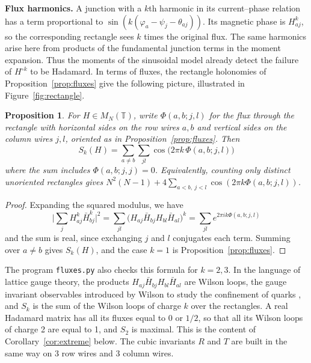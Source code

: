 \documentclass[11pt,a4paper]{article}
\newtheorem{prop}[thm]{Proposition}
\theoremstyle{remark}
\begin{document}
\medskip
\noindent\textbf{Flux harmonics.}
A junction with a $k$th harmonic in its current--phase relation has a term proportional to $\sin(k(\varphi_a-\psi_j-\theta_{aj}))$. Its magnetic phase is $H_{aj}^k$, so the corresponding rectangle sees $k$ times the original flux. The same harmonics arise here from products of the fundamental junction terms in the moment expansion. Thus the moments of the sinusoidal model already detect the failure of $H^{\circ k}$ to be Hadamard. In terms of fluxes, the rectangle holonomies of Proposition~\ref{prop:fluxes} give the following picture, illustrated in Figure~\ref{fig:rectangle}.

\begin{samepage}
\begin{prop}\label{prop:harmonics}
For $H\in M_N(\mathbb T)$, write $\Phi(a,b;j,l)$ for the flux through the rectangle with horizontal sides on the row wires $a,b$ and vertical sides on the column wires $j,l$, oriented as in Proposition~\ref{prop:fluxes}. Then
\[
 S_k(H)=\sum_{a\neq b}\sum_{jl}\cos\big(2\pi k\,\Phi(a,b;j,l)\big)
\]
where the sum includes $\Phi(a,b;j,j)=0$. Equivalently, counting only distinct unoriented rectangles gives $N^2(N-1)+4\sum_{a<b,\ j<l}\cos(2\pi k\Phi(a,b;j,l))$.
\end{prop}
\end{samepage}
\begin{proof}
Expanding the squared modulus, we have
\[
 \Big|\sum_jH_{aj}^k\bar H_{bj}^k\Big|^2=\sum_{jl}\big(H_{aj}\bar H_{bj}H_{bl}\bar H_{al}\big)^k=\sum_{jl}e^{2\pi ik\Phi(a,b;j,l)}
\]
and the sum is real, since exchanging $j$ and $l$ conjugates each term. Summing over $a\neq b$ gives $S_k(H)$, and the case $k=1$ is Proposition~\ref{prop:fluxes}.
\end{proof}

The program \texttt{fluxes.py} also checks this formula for $k=2,3$. In the language of lattice gauge theory, the products $H_{aj}\bar H_{bj}H_{bl}\bar H_{al}$ are Wilson loops, the gauge invariant observables introduced by Wilson to study the confinement of quarks \cite{wil}, and $S_k$ is the sum of the Wilson loops of charge $k$ over the rectangles. A real Hadamard matrix has all its fluxes equal to 0 or $1/2$, so that all its Wilson loops of charge 2 are equal to 1, and $S_2$ is maximal. This is the content of Corollary~\ref{cor:extreme} below. The cubic invariants $R$ and $T$ are built in the same way on 3 row wires and 3 column wires.
\end{document}
